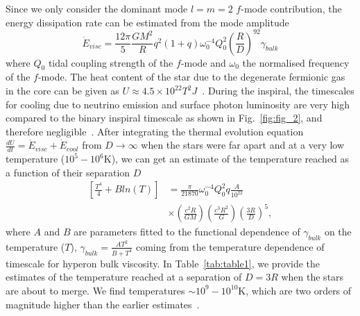 \documentclass[%
 reprint,
 amsmath,amssymb,
 aps,
]{revtex4-2}
\begin{document}
Since we only consider the dominant mode $l = m = 2$ $f$-mode contribution, the energy dissipation rate can be estimated from the mode amplitude~\cite{Lai_1994}
\begin{equation}\label{eq:viscener}
    \Dot{E}_{visc} = \frac{12\pi}{5}\frac{GM^2}{R}q^2(1+q)\omega_0^{-4}Q_0^2\left(\frac{R}{D}\right)^92\gamma_{bulk}
\end{equation}
where $Q_0$  tidal coupling strength of the $f$-mode and $\omega_0$ the normalised frequency of the $f$-mode. The heat content of the star due to the degenerate fermionic gas in the core can be given as $U \approx 4.5\times 10^{22}T^2 J$~\cite{Lai_1994}. During the inspiral, the timescales for cooling due to neutrino emission and surface photon luminosity are very high compared to the binary inspiral timescale as shown in Fig.~\ref{fig:fig_2}, and therefore negligible~\cite{Rees1992}. After integrating the thermal evolution equation $\frac{dU}{dt} = \Dot{E}_{visc} + \Dot{E}_{cool}$ from $D \to \infty$ when the stars were far apart and at a very low temperature ($10^5 - 10^6$K), we can get an estimate of the temperature reached as a function of their separation $D$
\begin{equation}\label{eq:final_T}
\begin{split}
    \left[\frac{T^4}{4} + Bln(T)\right] &=  \frac{\pi}{21870}\omega_0^{-4}Q_0^2q\frac{A}{10^{22}} \\ & \times \left(\frac{c^2R}{GM}\right)\left(\frac{c^3R^2}{G}\right)\left(\frac{3R}{D}\right)^5,
\end{split}    
\end{equation}
where $A$ and $B$ are parameters fitted to the functional dependence of $\gamma_{bulk}$ on the temperature ($T$), $\gamma_{bulk} = \frac{AT^2}{B+T^4}$ coming from the temperature dependence of timescale for hyperon bulk viscosity. In Table~\ref{tab:table1}, we provide the estimates of the temperature reached at a separation of $D = 3R$ when the stars are about to merge. We find temperatures $\sim 10^9 - 10^{10}$K, which are two orders of magnitude higher than the earlier estimates~\cite{Lai_1994,Arras2019}. 
\end{document}
